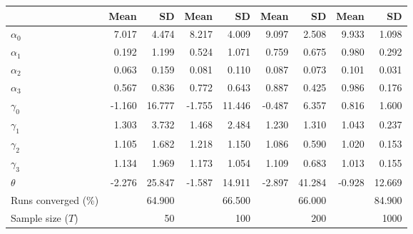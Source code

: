 
\begin{tabular}[t]{lrrrrrrrr}
\toprule
  & Mean & SD & Mean  & SD  & Mean   & SD   & Mean    & SD   \\
\midrule
$\alpha_{0}$ & 7.017 & 4.474 & 8.217 & 4.009 & 9.097 & 2.508 & 9.933 & 1.098\\
$\alpha_{1}$ & 0.192 & 1.199 & 0.524 & 1.071 & 0.759 & 0.675 & 0.980 & 0.292\\
$\alpha_{2}$ & 0.063 & 0.159 & 0.081 & 0.110 & 0.087 & 0.073 & 0.101 & 0.031\\
$\alpha_{3}$ & 0.567 & 0.836 & 0.772 & 0.643 & 0.887 & 0.425 & 0.986 & 0.176\\
$\gamma_{0}$ & -1.160 & 16.777 & -1.755 & 11.446 & -0.487 & 6.357 & 0.816 & 1.600\\
$\gamma_{1}$ & 1.303 & 3.732 & 1.468 & 2.484 & 1.230 & 1.310 & 1.043 & 0.237\\
$\gamma_{2}$ & 1.105 & 1.682 & 1.218 & 1.150 & 1.086 & 0.590 & 1.020 & 0.153\\
$\gamma_{3}$ & 1.134 & 1.969 & 1.173 & 1.054 & 1.109 & 0.683 & 1.013 & 0.155\\
$\theta$ & -2.276 & 25.847 & -1.587 & 14.911 & -2.897 & 41.284 & -0.928 & 12.669\\
Runs converged (\%) &  & 64.900 &  & 66.500 &  & 66.000 &  & 84.900\\
Sample size ($T$) &  & 50 &  & 100 &  & 200 &  & 1000\\
\bottomrule
\end{tabular}
